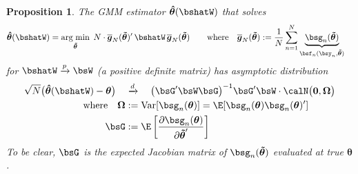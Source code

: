 \documentclass[12pt]{article}
\theoremstyle{plain}
\newtheorem{prop}[thm]{Proposition}
\theoremstyle{definition}
\theoremstyle{remark}
\newcommand{\bstheta}{\boldsymbol{\theta}}
\newcommand{\bsOmega}{\boldsymbol{\Omega}}
\newcommand{\bshattheta}{\boldsymbol{\hat{\theta}}}
\newcommand{\bstildetheta}{\boldsymbol{\tilde{\theta}}}
\newcommand{\bsbarg}{\boldsymbol{\overline{g}}}
\renewcommand{\bso}{\boldsymbol{0}}
\DeclareMathOperator*{\argmin}{arg\;min}
\newcommand{\Var}{\operatorname{Var}}
\newcommand{\pto}{\xrightarrow{p}}
\newcommand{\dto}{\xrightarrow{d}}
\newcommand{\sumnN}{\sum^N_{n=1}}
\begin{document}
\begin{prop}
The GMM estimator $\bshattheta(\bshatW)$ that solves
\begin{align*}
  \bshattheta(\bshatW)
  &=
  \argmin_{\bstildetheta}\;
  N \cdot \bsbarg_N(\bstildetheta)' \,\bshatW \,\bsbarg_N(\bstildetheta)
  \qquad
  \text{where}\quad
  \bsbarg_N(\bstildetheta)
  := \frac{1}{N}\sumnN
  \underbrace{\bsg_n(\bstildetheta)}_{\bsf_n(\bsy_n,\bstildetheta)}
\end{align*}
for $\bshatW\pto\bsW$ (a positive definite matrix)
has asymptotic distribution
\begin{align*}
  \sqrt{N}\big(\bshattheta(\bshatW)-\bstheta\big)
  \quad&\dto\quad
  \big( \bsG' \bsW \bsG \big)^{-1}
  \bsG' \bsW
  \cdot
  \calN\big(\bso,\bsOmega\big)
  \\
  \text{where}\quad
  \bsOmega &:= \Var[\bsg_n(\bstheta)]
  = \E[\bsg_n(\bstheta)\bsg_n(\bstheta)']
  \\
  \bsG &:= \E\left[
    \frac{\partial \bsg_n(\bstheta)}{\partial \bstildetheta'}
  \right]
\end{align*}
To be clear, $\bsG$ is the expected Jacobian matrix of
$\bsg_n(\bstildetheta)$ evaluated at true $\bstheta$.
\end{prop}
\end{document}
